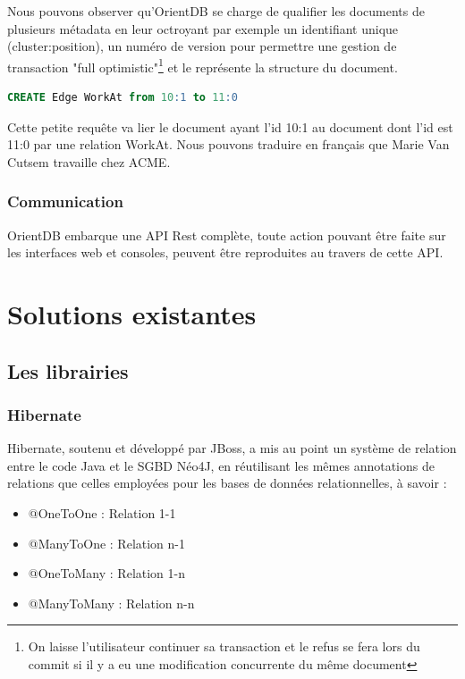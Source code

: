 \documentclass[a4paper,fleqn,12pt]{report}
\begin{document}
Nous pouvons observer qu'OrientDB se charge de qualifier les documents de plusieurs métadata en leur octroyant par exemple un identifiant unique (\no cluster:position), un numéro de version pour permettre une gestion de transaction "full optimistic"\footnote{On laisse l'utilisateur continuer sa transaction et le refus se fera lors du commit si il y a eu une modification concurrente du même document} et le \@class représente la structure du document.

\begin{lstlisting}[language=SQL]
CREATE Edge WorkAt from 10:1 to 11:0
\end{lstlisting}

Cette petite requête va lier le document ayant l'id 10:1 au document dont l'id est 11:0 par une relation WorkAt. Nous pouvons traduire en français que Marie Van Cutsem travaille chez ACME.


\subsection{Communication}

OrientDB embarque une API Rest complète, toute action pouvant être faite sur les interfaces web et consoles, peuvent être reproduites au travers de cette API.


\chapter{Solutions existantes}


\section{Les librairies} 

\subsection{Hibernate}

Hibernate, soutenu et développé par JBoss, a mis au point un système de relation entre le code Java et le SGBD Néo4J, en réutilisant les mêmes annotations de relations que celles employées pour les bases de données relationnelles, à savoir :

\begin{itemize}
\item @OneToOne : Relation 1-1
\item @ManyToOne : Relation n-1
\item @OneToMany : Relation 1-n
\item @ManyToMany : Relation n-n
\end{itemize}
\end{document}

